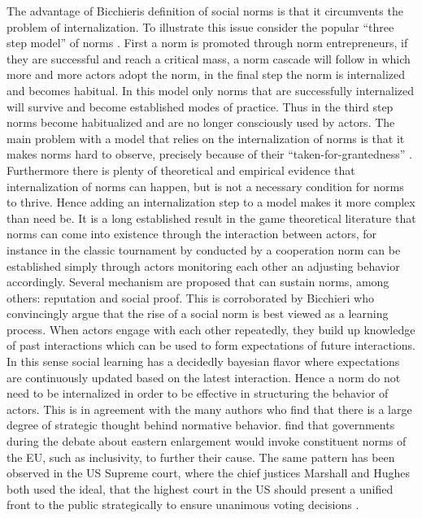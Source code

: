 The advantage of Bicchieris definition of social norms is that it circumvents the problem of internalization. To illustrate this issue consider the popular ``three step model'' of norms \citet{Finnemore1998}. First a norm is promoted through norm entrepreneurs, if they are successful and reach a critical mass, a norm cascade will follow in which more and more actors adopt the norm, in the final step the norm is internalized and becomes habitual. In this model only norms that are successfully internalized will survive and become established modes of practice. Thus in the third step norms become habitualized and are no longer consciously used by actors. The main problem with a model that relies on the internalization of norms is that it makes norms hard to observe, precisely because of their ``taken-for-grantedness'' \citep[495]{Johnston2001}. Furthermore there is plenty of theoretical and empirical evidence that internalization of norms can happen, but is not a necessary condition for norms to thrive. Hence adding an internalization step to a model makes it more complex than need be. It is a long established result in the game theoretical literature that norms can come into existence through the interaction between actors, for instance in the classic tournament by conducted by \cite{Axelrod1986} a cooperation norm can be established simply through actors monitoring each other an adjusting behavior accordingly. Several mechanism are proposed that can sustain norms, among others: reputation and social proof. This is corroborated by Bicchieri who convincingly argue that the rise of a social norm is best viewed as a learning process. When actors engage with each other repeatedly, they build up knowledge of past interactions which can be used to form expectations of future interactions. In this sense social learning has a decidedly bayesian flavor where expectations are continuously updated based on the latest interaction. Hence a norm do not need to be internalized in order to be effective in structuring the behavior of actors.  This is in agreement with the many authors who find that there is a large degree of strategic thought behind normative behavior. \citet{Schimmelfennig2003} find that governments during the debate about eastern enlargement would invoke constituent norms of the EU, such as inclusivity, to further their cause. The same pattern has been observed in the US Supreme court, where the chief justices Marshall and Hughes both used the ideal, that the highest court in the US should present a unified front to the public strategically to ensure unanimous voting decisions \citep{CalderiaZorn1998,EpsteinSegalSpaeth2001}.  


